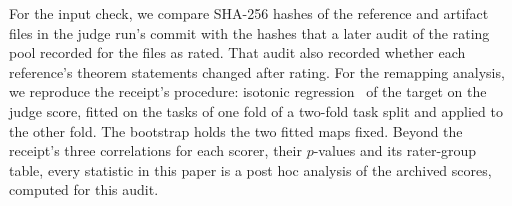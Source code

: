 For the input check, we compare SHA-256 hashes of the reference and artifact files in the judge run's commit with the hashes that a later audit of the rating pool recorded for the files as rated.
That audit also recorded whether each reference's theorem statements changed after rating.
For the remapping analysis, we reproduce the receipt's procedure: isotonic regression~\citep{barlow1972statistical} of the target on the judge score, fitted on the tasks of one fold of a two-fold task split and applied to the other fold.
The bootstrap holds the two fitted maps fixed.
Beyond the receipt's three correlations for each scorer, their $p$-values and its rater-group table, every statistic in this paper is a post hoc analysis of the archived scores, computed for this audit.
